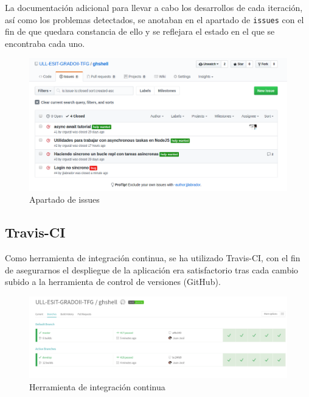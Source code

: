 La documentación adicional para llevar a cabo los desarrollos de cada iteración, así como los problemas detectados, se anotaban en el apartado de \verb|issues| con el fin de que quedara constancia de ello y se reflejara el estado en el que se encontraba cada uno.

\begin{figure}[H]
\begin{center}
\includegraphics[width=1\textwidth]{images/github3}
\caption{Apartado de issues}
\label{fig:github3}
\end{center}
\end{figure}

\subsection{Travis-CI}
\label{subsec:2.1.2}

Como herramienta de integración continua, se ha utilizado Travis-CI, con el fin de asegurarnos el despliegue de la aplicación era satisfactorio tras cada cambio subido a la herramienta de control de versiones (GitHub).

\begin{figure}[H]
\begin{center}
\includegraphics[width=1.1\textwidth]{images/travis-ci}
\caption{Herramienta de integración continua}
\label{fig:travisci}
\end{center}
\end{figure}


